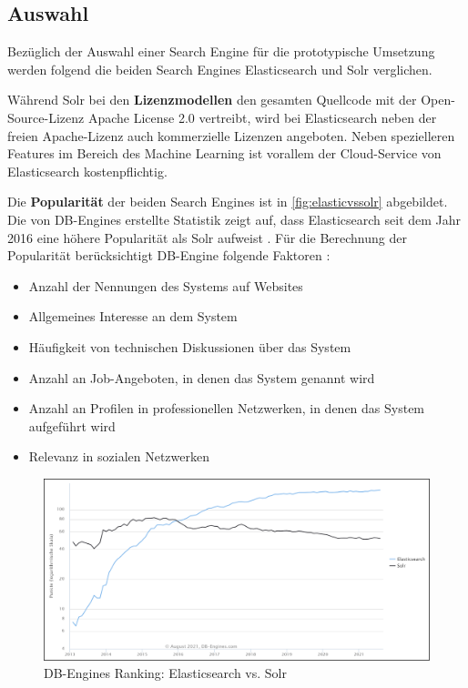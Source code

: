 \subsection{Auswahl\label{subsec4.2.5:Unterunterpunkt-5}}

Bezüglich der Auswahl einer Search Engine für die prototypische Umsetzung werden folgend die beiden Search Engines \glqq Elasticsearch\grqq{} und \glqq Solr\grqq{} verglichen.

Während Solr bei den \textbf{Lizenzmodellen} den gesamten Quellcode mit der Open-Source-Lizenz \glqq Apache License 2.0\grqq{} vertreibt, wird bei Elasticsearch neben der freien Apache-Lizenz auch kommerzielle Lizenzen angeboten. Neben spezielleren Features im Bereich des Machine Learning ist vorallem der Cloud-Service von Elasticsearch kostenpflichtig.

Die \textbf{Popularität} der beiden Search Engines ist in \autoref{fig:elasticvssolr} abgebildet. Die von DB-Engines erstellte Statistik zeigt auf, dass Elasticsearch seit dem Jahr 2016 eine höhere Popularität als Solr aufweist \cite{DBEngines.2021}. Für die Berechnung der Popularität berücksichtigt DB-Engine folgende Faktoren \cite{DBEngines.2021b}:

\begin{itemize}
    \item Anzahl der Nennungen des Systems auf Websites
    \item Allgemeines Interesse an dem System
    \item Häufigkeit von technischen Diskussionen über das System
    \item Anzahl an Job-Angeboten, in denen das System genannt wird
    \item Anzahl an Profilen in professionellen Netzwerken, in denen das System aufgeführt wird
    \item Relevanz in sozialen Netzwerken
\end{itemize}

\begin{figure}[H]
    \centering
    \includegraphics[width=0.81\linewidth]{images/elasticvssolr.png}
    \caption{DB-Engines Ranking: Elasticsearch vs. Solr \cite{DBEngines.2021}}
    \label{fig:elasticvssolr}
\end{figure}

